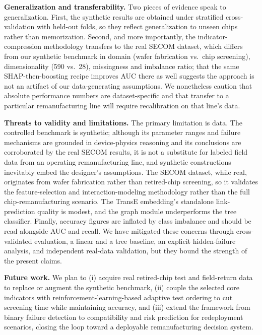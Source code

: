 \documentclass[electronics,article,submit,pdftex,moreauthors]{Definitions/mdpi}
\begin{document}
\textbf{Generalization and transferability.} Two pieces of evidence speak to generalization. First, the synthetic results are obtained under stratified cross-validation with held-out folds, so they reflect generalization to unseen chips rather than memorization. Second, and more importantly, the indicator-compression methodology transfers to the real SECOM dataset, which differs from our synthetic benchmark in domain (wafer fabrication vs.\ chip screening), dimensionality (590 vs.\ 28), missingness and imbalance ratio; that the same SHAP-then-boosting recipe improves AUC there as well suggests the approach is not an artifact of our data-generating assumptions. We nonetheless caution that absolute performance numbers are dataset-specific and that transfer to a particular remanufacturing line will require recalibration on that line's data.

\textbf{Threats to validity and limitations.} The primary limitation is data. The controlled benchmark is synthetic; although its parameter ranges and failure mechanisms are grounded in device-physics reasoning and its conclusions are corroborated by the real SECOM results, it is not a substitute for labeled field data from an operating remanufacturing line, and synthetic constructions inevitably embed the designer's assumptions. The SECOM dataset, while real, originates from wafer fabrication rather than retired-chip screening, so it validates the feature-selection and interaction-modeling methodology rather than the full chip-remanufacturing scenario. The TransE embedding's standalone link-prediction quality is modest, and the graph module underperforms the tree classifier. Finally, accuracy figures are inflated by class imbalance and should be read alongside AUC and recall. We have mitigated these concerns through cross-validated evaluation, a linear and a tree baseline, an explicit hidden-failure analysis, and independent real-data validation, but they bound the strength of the present claims.

\textbf{Future work.} We plan to (i) acquire real retired-chip test and field-return data to replace or augment the synthetic benchmark, (ii) couple the selected core indicators with reinforcement-learning-based adaptive test ordering to cut screening time while maintaining accuracy, and (iii) extend the framework from binary failure detection to compatibility and risk prediction for redeployment scenarios, closing the loop toward a deployable remanufacturing decision system.

\end{document}
